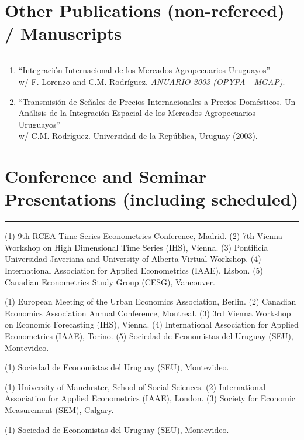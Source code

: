 \documentclass[overlapped,letterpaper,11pt]{res}
\newcommand{\cvrule}{%
  \hspace*{-\sectionwidth}%
  \rule[2mm]{\dimexpr\textwidth+\sectionwidth\relax}{.25pt}}
\newcommand{\cvsection}[1]{%
  \needspace{4\baselineskip}%
  \section{\textbf{#1}}%
  \cvrule}
\newenvironment{cventries}%
  {\begin{enumerate}\interlinepenalty=10000\relax}%
  {\end{enumerate}}
\begin{document}
\begin{resume}
\cvsection{Other Publications (non-refereed) / Manuscripts}
\begin{cventries}
	\item ``Integraci\'on Internacional de los Mercados Agropecuarios Uruguayos'' \\
	w/ F. Lorenzo and C.M. Rodr\'iguez. \textit{ANUARIO 2003 (OPYPA - MGAP)}.
	\item ``Transmisi\'on de Se\~nales de Precios Internacionales a Precios Dom\'esticos.
	Un An\'alisis de la Integraci\'on Espacial de los Mercados Agropecuarios Uruguayos'' \\
	w/ C.M. Rodr\'iguez. Universidad de la Rep\'ublica, Uruguay (2003).
\end{cventries}


\cvsection{Conference and Seminar Presentations (including scheduled)}
\begin{mylist}

	\item [2026]
	(1) 9th RCEA Time Series Econometrics Conference, Madrid.
	(2) 7th Vienna Workshop on High Dimensional Time Series (IHS), Vienna.
	(3) Pontificia Universidad Javeriana and University of Alberta Virtual Workshop.
	(4) International Association for Applied Econometrics (IAAE), Lisbon.
	(5) Canadian Econometrics Study Group (CESG), Vancouver.

	\item [2025]
	(1) European Meeting of the Urban Economics Association, Berlin.
	(2) Canadian Economics Association Annual Conference, Montreal.
	(3) 3rd Vienna Workshop on Economic Forecasting (IHS), Vienna.
	(4) International Association for Applied Econometrics (IAAE), Torino.
	(5) Sociedad de Economistas del Uruguay (SEU), Montevideo.

	\item [2024]
	(1) Sociedad de Economistas del Uruguay (SEU), Montevideo.

	\item [2022]
	(1) University of Manchester, School of Social Sciences.
	(2) International Association for Applied Econometrics (IAAE), London.
	(3) Society for Economic Measurement (SEM), Calgary.

	\item [2020]
	(1) Sociedad de Economistas del Uruguay (SEU), Montevideo.


\end{mylist}
\end{resume}
\end{document}
